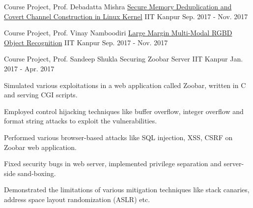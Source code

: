\documentclass[11pt, a4paper]{cv}
\begin{document}
\begin{cventries}

  \cventry
    {Course Project, Prof. Debadatta Mishra} %
        {\href{http://home.iitk.ac.in/~shivansh/resources/secure-deduplication.pdf}{Secure Memory Deduplication and Covert Channel Construction in Linux Kernel}} %
    {IIT Kanpur} %
    {Sep. 2017 - Nov. 2017} %
    {
      \begin{cvitems} %
        \item {}
      \end{cvitems}
    }

  \cventry
    {Course Project, Prof. Vinay Namboodiri} %
        {\href{http://home.iitk.ac.in/~shivansh/resources/multimodal-rgbd.pdf}{Large Margin Multi-Modal RGBD Object Recognition}} %
    {IIT Kanpur} %
    {Sep. 2017 - Nov. 2017} %
    {
      \begin{cvitems} %
        \item {}
      \end{cvitems}
    }

  \cventry
    {Course Project, Prof. Sandeep Shukla} %
    {Securing Zoobar Server} %
    {IIT Kanpur} %
    {Jan. 2017 - Apr. 2017} %
    {
      \begin{cvitems} %
        \item {Simulated various exploitations in a web application called Zoobar, written in C and serving CGI scripts.}
        \item {Employed control hijacking techniques like buffer overflow, integer overflow and format string attacks to exploit the vulnerabilities.}
        \item {Performed various browser-based attacks like SQL injection, XSS, CSRF on Zoobar web application.}
        \item {Fixed security bugs in web server, implemented privilege separation and server-side sand-boxing.}
        \item {Demonstrated the limitations of various mitigation techniques like stack canaries, address space layout randomization (ASLR) etc.}
      \end{cvitems}
    }

\end{cventries}
\end{document}
